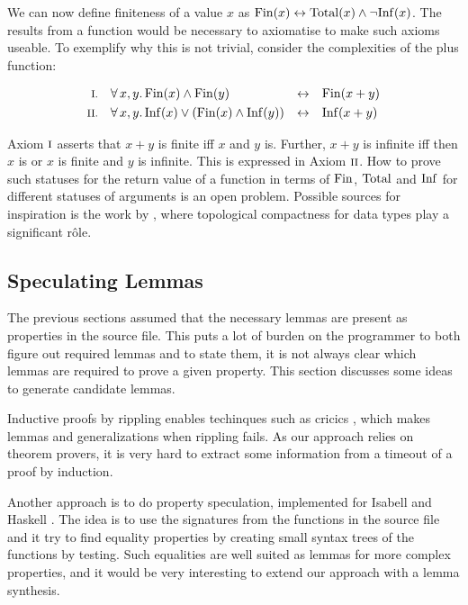 \pagebreak

We can now define finiteness of a value $x$ as
$\mathrm{Fin}(x) \leftrightarrow \mathrm{Total}(x) \wedge \neg \mathrm{Inf}(x)$.  The results
from a function would be necessary to axiomatise to make such axioms
useable. To exemplify why this is not trivial, consider the
complexities of the plus function:

\begin{align*}
\rom{1} && \faa{x}{y} & \Fin(x) \wedge \Fin(y)                  & \leftrightarrow &&& \Fin(x + y) \\
\rom{2} && \faa{x}{y} & \Inf(x) \vee (\Fin(x) \wedge \Inf(y)) & \leftrightarrow &&& \Inf(x + y)
\end{align*}

\noindent
Axiom $\romnodot{1}$ asserts that $x + y$ is finite iff $x$ and $y$
is. Further, $x + y$ is infinite iff then $x$ is or $x$ is finite and
$y$ is infinite. This is expressed in Axiom $\romnodot{2}$. How to
prove such statuses for the return value of a function in terms of
$\mathrm{Fin}$, $\mathrm{Total}$ and $\mathrm{Inf}$ for different statuses of arguments is an
open problem. Possible sources for inspiration is the work by
\cite{exhaustiblesets}, where topological compactness for data types
play a significant r\^{o}le.

\subsection{Speculating Lemmas}

The previous sections assumed that the necessary lemmas are present as
properties in the source file. This puts a lot of burden on the
programmer to both figure out required lemmas and to state them, it is
not always clear which lemmas are required to prove a given
property. This section discusses some ideas to generate candidate
lemmas.

Inductive proofs by rippling enables techinques such as cricics
\citep{productiveuse}, which makes lemmas and generalizations when
rippling fails. As our approach relies on theorem provers, it is very
hard to extract some information from a timeout of a proof by induction.

Another approach is to do property speculation, implemented for
Isabell \cite{isacosy} and Haskell \cite{quickspec}. The idea is to
use the signatures from the functions in the source file and it try to
find equality properties by creating small syntax trees of the
functions by testing. Such equalities are well suited as lemmas for
more complex properties, and it would be very interesting to extend
our approach with a lemma synthesis.


